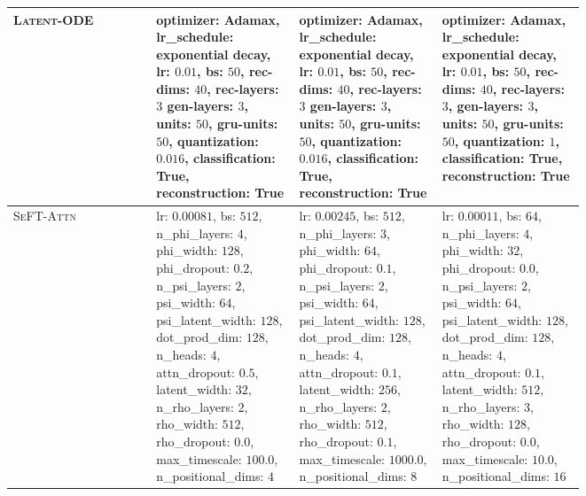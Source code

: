 \documentclass{article}
\newcommand{\methodname}     {\textsc{SeFT}\xspace}
\newcommand{\method}[1]{\textsc{#1}}
\begin{document}
\begin{table*}
\begin{tabularx}{\linewidth}{Xp{0.25\linewidth}p{0.25\linewidth}p{0.25\linewidth}}
\midrule
\method{Latent-ODE} & 
    optimizer: Adamax, lr\_schedule: exponential decay, lr: $0.01$, bs: $50$, rec-dims: $40$, rec-layers: $3$ gen-layers: $3$, units: $50$, gru-units: $50$, quantization: $0.016$, classification: True, reconstruction: True &
    optimizer: Adamax, lr\_schedule: exponential decay, lr: $0.01$, bs: $50$, rec-dims: $40$, rec-layers: $3$ gen-layers: $3$, units: $50$, gru-units: $50$, quantization: $0.016$, classification: True, reconstruction: True &
    optimizer: Adamax, lr\_schedule: exponential decay, lr: $0.01$, bs: $50$, rec-dims: $40$, rec-layers: $3$, gen-layers: $3$, units: $50$, gru-units: $50$, quantization: $1$, classification: True, reconstruction: True \\
\midrule
\method{\methodname-Attn} &
    lr: $0.00081$, bs: $512$, n\_phi\_layers: $4$, phi\_width: $128$, phi\_dropout: $0.2$, n\_psi\_layers: $2$, psi\_width: $64$, psi\_latent\_width: $128$, dot\_prod\_dim: $128$, n\_heads: $4$, attn\_dropout: $0.5$, latent\_width: $32$, n\_rho\_layers: $2$, rho\_width: $512$, rho\_dropout: $0.0$, max\_timescale: $100.0$, n\_positional\_dims: $4$ &
    lr: $0.00245$, bs: $512$, n\_phi\_layers: $3$, phi\_width: $64$, phi\_dropout: $0.1$, n\_psi\_layers: $2$, psi\_width: $64$, psi\_latent\_width: $128$, dot\_prod\_dim: $128$, n\_heads: $4$, attn\_dropout: $0.1$, latent\_width: $256$, n\_rho\_layers: $2$, rho\_width: $512$, rho\_dropout: $0.1$, max\_timescale: $1000.0$, n\_positional\_dims: $8$ &
    lr: $0.00011$, bs: $64$, n\_phi\_layers: $4$, phi\_width: $32$, phi\_dropout: $0.0$, n\_psi\_layers: $2$, psi\_width: $64$, psi\_latent\_width: $128$, dot\_prod\_dim: $128$, n\_heads: $4$, attn\_dropout: $0.1$, latent\_width: $512$, n\_rho\_layers: $3$, rho\_width: $128$, rho\_dropout: $0.0$, max\_timescale: $10.0$, n\_positional\_dims: $16$ \\
\bottomrule
\end{tabularx}
\end{table*}
\end{document}
